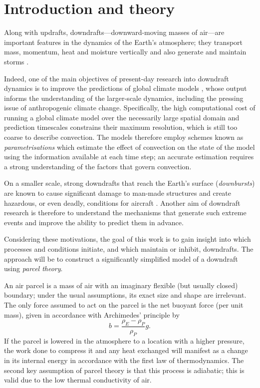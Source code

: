 \documentclass[12pt,titlepage]{article}
\begin{document}
\tableofcontents

\clearpage
\section{Introduction and theory}
Along with updrafts, downdrafts---downward-moving masses of air---are
important features in the dynamics of the Earth's atmosphere;
they transport mass, momentum, heat and moisture vertically
and also generate and maintain storms \parencite{knupp_cotton_1985}.

Indeed, one of the main objectives of present-day research into
downdraft dynamics is to improve the predictions of global climate
models \parencite{thayer-calder_2013}, whose output informs the
understanding of the larger-scale
dynamics, including the pressing issue of anthropogenic climate
change. Specifically, the high computational cost of running a global
climate model over the necessarily large spatial domain and prediction
timescales constrains their maximum resolution, which is still too
coarse to describe convection. The models therefore employ schemes
known as \emph{parametrisations} which estimate the effect of
convection on the state of the model using the information available
at each time step; an accurate estimation requires a strong
understanding of the factors that govern convection.

On a smaller scale, strong downdrafts that reach the Earth's surface
(\emph{downbursts}) are known to cause significant damage to
man-made structures and create hazardous, or even deadly, conditions
for aircraft \parencite{thayer-calder_2013}. Another aim of downdraft
research is therefore to understand the mechanisms that generate
such extreme events and improve the ability to predict them in advance.

Considering these motivations, the goal of this work is to gain
insight into which processes and conditions initiate, and which
maintain or inhibit, downdrafts. The approach will be to construct
a significantly simplified model of a downdraft using \emph{parcel
theory}.

An air parcel is a mass of air with an imaginary flexible (but usually
closed) boundary; under the usual assumptions, its exact size and
shape are irrelevant. The only force assumed to act on the parcel is
the net buoyant force (per unit mass), given in accordance with
Archimedes' principle by
\begin{equation}
	b = \frac{\rho_E - \rho_P}{\rho_P} g.
	\label{eqn:buoyancy}
\end{equation}
If the parcel is lowered in the atmosphere to a location with a higher
pressure, the work done to compress it and any heat exchanged will
manifest as a change in its internal energy in accordance with the
first law of thermodynamics. The second key assumption of parcel theory
is that this process is adiabatic; this is valid due to the low
thermal conductivity of air.
\end{document}

